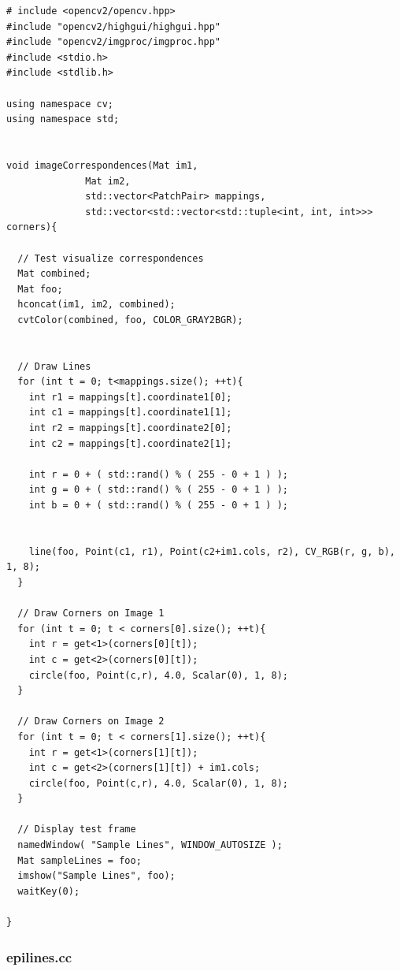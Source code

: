 \documentclass[letterpaper,11pt]{article}
\begin{document}
\begin{verbatim}
# include <opencv2/opencv.hpp>
#include "opencv2/highgui/highgui.hpp"
#include "opencv2/imgproc/imgproc.hpp"
#include <stdio.h>
#include <stdlib.h>

using namespace cv;
using namespace std;


void imageCorrespondences(Mat im1,
			  Mat im2,
			  std::vector<PatchPair> mappings,
			  std::vector<std::vector<std::tuple<int, int, int>>> corners){

  // Test visualize correspondences
  Mat combined;
  Mat foo;
  hconcat(im1, im2, combined);
  cvtColor(combined, foo, COLOR_GRAY2BGR);   


  // Draw Lines
  for (int t = 0; t<mappings.size(); ++t){
    int r1 = mappings[t].coordinate1[0];
    int c1 = mappings[t].coordinate1[1];
    int r2 = mappings[t].coordinate2[0];
    int c2 = mappings[t].coordinate2[1];

    int r = 0 + ( std::rand() % ( 255 - 0 + 1 ) );
    int g = 0 + ( std::rand() % ( 255 - 0 + 1 ) );
    int b = 0 + ( std::rand() % ( 255 - 0 + 1 ) );    


    line(foo, Point(c1, r1), Point(c2+im1.cols, r2), CV_RGB(r, g, b), 1, 8);    
  }

  // Draw Corners on Image 1
  for (int t = 0; t < corners[0].size(); ++t){
    int r = get<1>(corners[0][t]);
    int c = get<2>(corners[0][t]);
    circle(foo, Point(c,r), 4.0, Scalar(0), 1, 8);    
  }

  // Draw Corners on Image 2
  for (int t = 0; t < corners[1].size(); ++t){
    int r = get<1>(corners[1][t]);
    int c = get<2>(corners[1][t]) + im1.cols;
    circle(foo, Point(c,r), 4.0, Scalar(0), 1, 8);    
  }

  // Display test frame
  namedWindow( "Sample Lines", WINDOW_AUTOSIZE );
  Mat sampleLines = foo;
  imshow("Sample Lines", foo);
  waitKey(0);

}
\end{verbatim}  

\subsubsection{epilines.cc}
\end{document}
